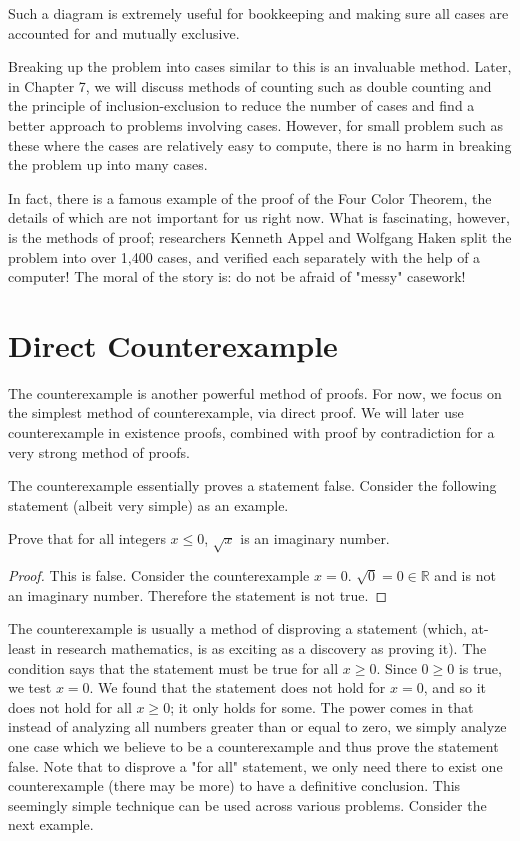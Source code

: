 Such a diagram is extremely useful for bookkeeping and making sure all cases are accounted for and mutually exclusive.

Breaking up the problem into cases similar to this is an invaluable method. Later, in Chapter 7, we will discuss methods of counting such as double counting and the principle of inclusion-exclusion to reduce the number of cases and find a better approach to problems involving cases. However, for small problem such as these where the cases are relatively easy to compute, there is no harm in breaking the problem up into many cases. 

In fact, there is a famous example of the proof of the Four Color Theorem, the details of which are not important for us right now. What is fascinating, however, is the methods of proof; researchers Kenneth Appel and Wolfgang Haken split the problem into over 1,400 cases, and verified each separately with the help of a computer! The moral of the story is: do not be afraid of "messy" casework!












\section{Direct Counterexample}
The counterexample is another powerful method of proofs. For now, we focus on the simplest method of counterexample, via direct proof. We will later use counterexample in existence proofs, combined with proof by contradiction for a very strong method of proofs. 

The counterexample essentially proves a statement false. Consider the following statement (albeit very simple) as an example.
\begin{example}
Prove that for all integers $x \leq 0$, $\sqrt{x}$ is an imaginary number.
\end{example}
\begin{proof}
This is false. Consider the counterexample $x=0$. $\sqrt{0}=0 \in\mathbb{R}$ and is not an imaginary number. Therefore the statement is not true. 
\end{proof}

The counterexample is usually a method of disproving a statement (which, at-least in research mathematics, is as exciting as a discovery as proving it). The condition says that the statement must be true for all $x \geq 0$. Since $0 \geq 0$ is true, we test $x = 0$. We found that the statement does not hold for $x=0$, and so it does not hold for all $x \geq 0$; it only holds for some. The power comes in that instead of analyzing all numbers greater than or equal to zero, we simply analyze one case which we believe to be a counterexample and thus prove the statement false. Note that to disprove a "for all" statement, we only need there to exist one counterexample (there may be more) to have a definitive conclusion. This seemingly simple technique can be used across various problems. Consider the next example.

